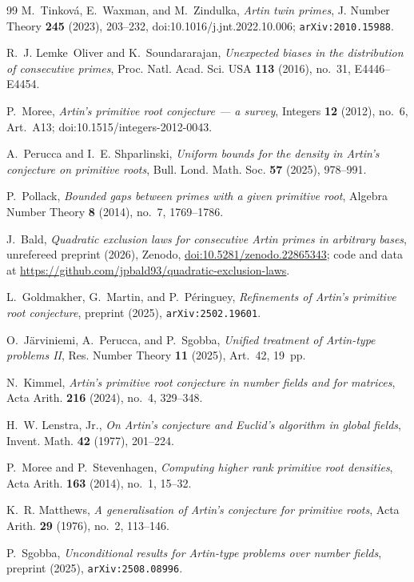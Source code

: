 \documentclass[11pt,reqno]{amsart}
\theoremstyle{plain}
\theoremstyle{definition}
\begin{document}
\begin{thebibliography}{99}
	M.~Tinkov\'a, E.~Waxman, and M.~Zindulka,
	\emph{Artin twin primes},
	J. Number Theory \textbf{245} (2023), 203--232,
	doi:10.1016/j.jnt.2022.10.006;
	\texttt{arXiv:2010.15988}.

	R.~J. Lemke~Oliver and K.~Soundararajan,
	\emph{Unexpected biases in the distribution of consecutive primes},
	Proc. Natl. Acad. Sci. USA \textbf{113} (2016), no.~31, E4446--E4454.

	P.~Moree,
	\emph{Artin's primitive root conjecture --- a survey},
	Integers \textbf{12} (2012), no.~6, Art.~A13;
	doi:10.1515/integers-2012-0043.

	A.~Perucca and I.~E. Shparlinski,
	\emph{Uniform bounds for the density in Artin's conjecture on primitive roots},
	Bull. Lond. Math. Soc. \textbf{57} (2025), 978--991.

	P.~Pollack,
	\emph{Bounded gaps between primes with a given primitive root},
	Algebra Number Theory \textbf{8} (2014), no.~7, 1769--1786.

 J.~Bald, \emph{Quadratic exclusion laws for consecutive Artin primes in arbitrary bases}, unrefereed preprint (2026), Zenodo, \href{https://doi.org/10.5281/zenodo.22865343}{doi:10.5281/zenodo.22865343}; code and data at \url{https://github.com/jpbald93/quadratic-exclusion-laws}.

L.~Goldmakher, G.~Martin, and P.~P\'eringuey,
\emph{Refinements of Artin's primitive root conjecture},
preprint (2025), \texttt{arXiv:2502.19601}.

O.~J\"arviniemi, A.~Perucca, and P.~Sgobba,
\emph{Unified treatment of Artin-type problems II},
Res. Number Theory \textbf{11} (2025), Art.~42, 19~pp.

N.~Kimmel,
\emph{Artin's primitive root conjecture in number fields and for matrices},
Acta Arith. \textbf{216} (2024), no.~4, 329--348.

H.~W. Lenstra, Jr.,
\emph{On Artin's conjecture and Euclid's algorithm in global fields},
Invent. Math. \textbf{42} (1977), 201--224.

P.~Moree and P.~Stevenhagen,
\emph{Computing higher rank primitive root densities},
Acta Arith. \textbf{163} (2014), no.~1, 15--32.

K.~R. Matthews,
\emph{A generalisation of Artin's conjecture for primitive roots},
Acta Arith. \textbf{29} (1976), no.~2, 113--146.

P.~Sgobba,
\emph{Unconditional results for Artin-type problems over number fields},
preprint (2025), \texttt{arXiv:2508.08996}.

\end{thebibliography}
\end{document}
